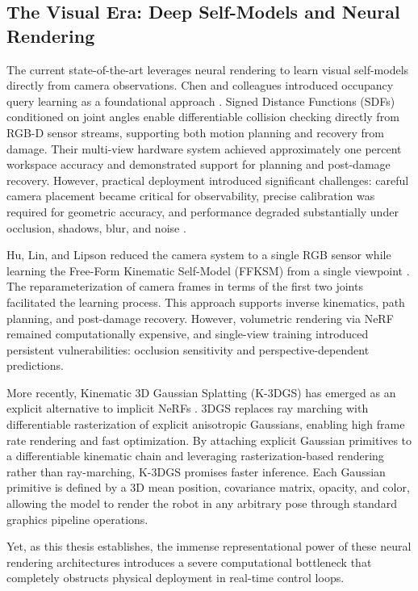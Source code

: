 \documentclass[12pt,a4paper,oneside]{report}
\begin{document}
\subsection{The Visual Era: Deep Self-Models and Neural Rendering}

The current state-of-the-art leverages neural rendering to learn visual self-models directly from camera observations. Chen and colleagues introduced occupancy query learning as a foundational approach \cite{chen2022full}. Signed Distance Functions (SDFs) conditioned on joint angles enable differentiable collision checking directly from RGB-D sensor streams, supporting both motion planning and recovery from damage. Their multi-view hardware system achieved approximately one percent workspace accuracy and demonstrated support for planning and post-damage recovery. However, practical deployment introduced significant challenges: careful camera placement became critical for observability, precise calibration was required for geometric accuracy, and performance degraded substantially under occlusion, shadows, blur, and noise \cite{chen2022full}.

Hu, Lin, and Lipson reduced the camera system to a single RGB sensor while learning the Free-Form Kinematic Self-Model (FFKSM) from a single viewpoint \cite{hu2024teaching}. The reparameterization of camera frames in terms of the first two joints facilitated the learning process. This approach supports inverse kinematics, path planning, and post-damage recovery. However, volumetric rendering via NeRF remained computationally expensive, and single-view training introduced persistent vulnerabilities: occlusion sensitivity and perspective-dependent predictions.

More recently, Kinematic 3D Gaussian Splatting (K-3DGS) has emerged as an explicit alternative to implicit NeRFs \cite{hu2025learning}. 3DGS replaces ray marching with differentiable rasterization of explicit anisotropic Gaussians, enabling high frame rate rendering and fast optimization. By attaching explicit Gaussian primitives to a differentiable kinematic chain and leveraging rasterization-based rendering rather than ray-marching, K-3DGS promises faster inference. Each Gaussian primitive is defined by a 3D mean position, covariance matrix, opacity, and color, allowing the model to render the robot in any arbitrary pose through standard graphics pipeline operations.

Yet, as this thesis establishes, the immense representational power of these neural rendering architectures introduces a severe computational bottleneck that completely obstructs physical deployment in real-time control loops.
\end{document}

